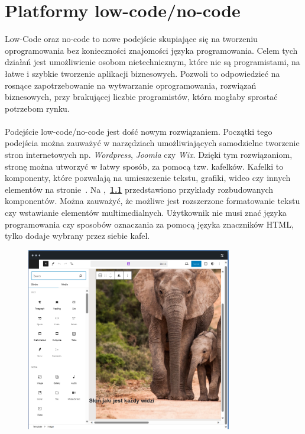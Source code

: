 \chapter{Platformy low-code/no-code}\label{cha:low}
Low-Code oraz no-code to nowe podejście skupiające się na tworzeniu oprogramowania bez konieczności znajomości języka programowania. Celem tych działań jest umożliwienie osobom nietechnicznym, które nie są programistami, na łatwe i szybkie tworzenie aplikacji biznesowych. Pozwoli to odpowiedzieć na rosnące zapotrzebowanie na wytwarzanie oprogramowania, rozwiązań biznesowych, przy brakującej liczbie programistów, która mogłaby sprostać potrzebom rynku.
\\ \\
Podejście low-code/no-code jest dość nowym rozwiązaniem. Początki tego podejścia można zauważyć w narzędziach umożliwiających samodzielne tworzenie stron internetowych np. \textit{Wordpress}, \textit{Joomla} czy \textit{Wix}. Dzięki tym rozwiązaniom, stronę można utworzyć w łatwy sposób, za pomocą tzw. kafelków. Kafelki to komponenty, które pozwalają na umieszczenie tekstu, grafiki, wideo czy innych elementów na stronie~\cite{Wordpress2023,Joomla2023,Wix2023}. Na ,~\textbf{\ref{fig:wp-plat}} przedstawiono przykłady rozbudowanych komponentów. Można zauważyć, że możliwe jest rozszerzone formatowanie tekstu czy wstawianie elementów multimedialnych. Użytkownik nie musi znać języka programowania czy sposobów oznaczania za pomocą języka znaczników HTML, tylko dodaje wybrany przez siebie kafel.

\begin{figure}[H]
    \centering
    \includegraphics[width=0.8\textwidth]{images/slon_wordpress}
    \label{fig:wp-plat}
\end{figure}

